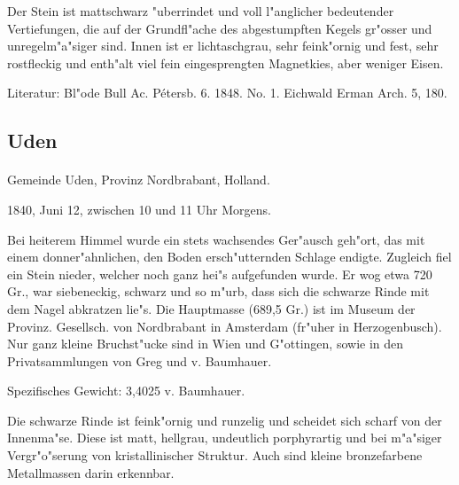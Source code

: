 \documentclass[a4paper, 11pt, oneside]{article}
\begin{document}
Der Stein ist mattschwarz "uberrindet und voll l"anglicher bedeutender Vertiefungen, die auf der Grundfl"ache des abgestumpften Kegels gr"osser und unregelm"a"siger sind. Innen ist er lichtaschgrau, sehr feink"ornig und fest, sehr rostfleckig und enth"alt viel fein eingesprengten Magnetkies, aber weniger Eisen.

\footnotesize
Literatur: Bl"ode Bull Ac. Pétersb. 6. 1848. No. 1. Eichwald Erman Arch. 5, 180.

\subsection{Uden}
\normalsize
\paragraph{}
Gemeinde Uden, Provinz Nordbrabant, Holland.

1840, Juni 12, zwischen 10 und 11 Uhr Morgens.

Bei heiterem Himmel wurde ein stets wachsendes Ger"ausch geh"ort, das mit einem donner"ahnlichen, den Boden ersch"utternden Schlage endigte. Zugleich fiel ein Stein nieder, welcher noch ganz hei"s aufgefunden wurde. Er wog etwa 720 Gr., war siebeneckig, schwarz und so m"urb, dass sich die schwarze Rinde mit dem Nagel abkratzen lie"s. Die Hauptmasse (689,5 Gr.) ist im Museum der Provinz. Gesellsch. von Nordbrabant in Amsterdam (fr"uher in Herzogenbusch). Nur ganz kleine Bruchst"ucke sind in Wien und G"ottingen, sowie in den Privatsammlungen von Greg und v. Baumhauer.

Spezifisches Gewicht: 3,4025 v. Baumhauer.

Die schwarze Rinde ist feink"ornig und runzelig und scheidet sich scharf von der Innenma"se. Diese ist matt, hellgrau, undeutlich porphyrartig und bei m"a"siger Vergr"o"serung von kristallinischer Struktur. Auch sind kleine bronzefarbene Metallmassen darin erkennbar.
\end{document}
